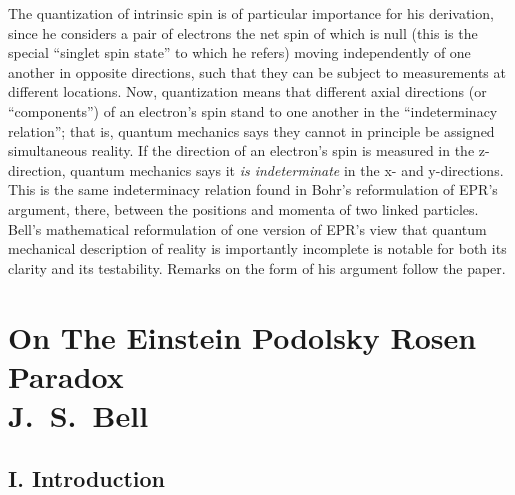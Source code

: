 The quantization of intrinsic spin is of particular importance for his derivation, since he considers a pair of electrons the net spin of which is null (this is the special ``singlet spin state'' to which he refers) moving independently of one another in opposite directions, such that they can be subject to measurements at different locations. Now, quantization means that different axial directions (or ``components'') of an electron's
spin stand to one another in the ``indeterminacy relation''; that is, quantum mechanics says they cannot
in principle be assigned simultaneous reality. If the direction of an electron's spin is measured in the z-direction, quantum mechanics says it \emph{is indeterminate} in the x- and y-directions. This is the same indeterminacy relation found in Bohr's reformulation of EPR's argument, there, between the positions and momenta of two linked particles. Bell's mathematical reformulation of one version of EPR's view that quantum mechanical description of reality is importantly incomplete is notable for both its clarity and its testability. Remarks on the form of his argument follow the paper.

\section*{On The Einstein Podolsky Rosen Paradox\\
	{\large J.~S.\ Bell}}

\subsection*{I. Introduction}

